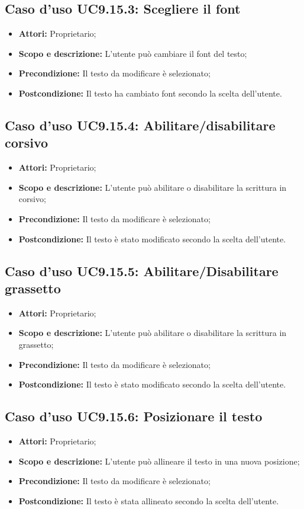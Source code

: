 \subsection{Caso d'uso UC9.15.3: Scegliere il \gls{font}}
\begin{itemize}
	\item \textbf{Attori:} Proprietario;
	\item \textbf{Scopo e descrizione:} L'utente può cambiare il \gls{font} del testo;
	\item \textbf{Precondizione:} Il testo da modificare è selezionato;
	\item \textbf{Postcondizione:} Il testo ha cambiato \gls{font} secondo la scelta dell'utente.
\end{itemize}

\subsection{Caso d'uso UC9.15.4: Abilitare/disabilitare corsivo}
\begin{itemize}
	\item \textbf{Attori:} Proprietario;
	\item \textbf{Scopo e descrizione:} L'utente può abilitare o disabilitare la scrittura in corsivo;
	\item \textbf{Precondizione:} Il testo da modificare è selezionato;
	\item \textbf{Postcondizione:} Il testo è stato modificato secondo la scelta dell'utente.
\end{itemize}

\subsection{Caso d'uso UC9.15.5: Abilitare/Disabilitare grassetto}
\begin{itemize}
	\item \textbf{Attori:} Proprietario;
	\item \textbf{Scopo e descrizione:} L'utente può abilitare o disabilitare la scrittura in grassetto;
	\item \textbf{Precondizione:} Il testo da modificare è selezionato;
	\item \textbf{Postcondizione:} Il testo è stato modificato secondo la scelta dell'utente.
\end{itemize}

\subsection{Caso d'uso UC9.15.6: Posizionare il testo}
\begin{itemize}
	\item \textbf{Attori:} Proprietario;
	\item \textbf{Scopo e descrizione:} L'utente può allineare il testo in una nuova posizione;
	\item \textbf{Precondizione:} Il testo da modificare è selezionato;
	\item \textbf{Postcondizione:} Il testo è stata allineato secondo la scelta dell'utente.
\end{itemize}

